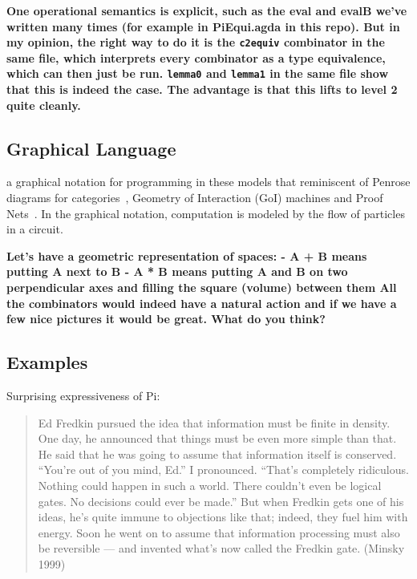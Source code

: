 \documentclass{article}
\newcommand{\amr}[1]{\fbox{Amr says:} \textbf{#1}}
\newcommand{\jc}[1]{\fbox{Jacques says:} \textbf{#1}}
\begin{document}
\jc{One operational semantics is explicit, such as the eval and 
evalB we've written many times (for example in PiEqui.agda in
this repo). But in my opinion, the right way to do it is the
\texttt{c2equiv} combinator in the same file, which interprets
every combinator as a type equivalence, which can then just be
run. \texttt{lemma0} and \texttt{lemma1} in the same file show
that this is indeed the case. The advantage is that this lifts
to level 2 quite cleanly.}

\subsection{Graphical Language} 

a graphical notation for programming in these models that reminiscent
of Penrose diagrams for categories~\cite{selinger-graphical}, Geometry
of Interaction (GoI) machines and Proof
Nets~\cite{Mackie2011,DBLP:conf/popl/Mackie95}. In the graphical
notation, computation is modeled by the flow of particles in a
circuit.

\amr{
  Let’s have a geometric representation of spaces:
- A + B means putting A next to B
- A * B means putting A and B on two perpendicular axes and filling
the square (volume) between them
All the combinators would indeed have a natural action and if we have
a few nice pictures it would be great. What do you think? }

\subsection{Examples} 

Surprising expressiveness of Pi:

\begin{quote}
  Ed Fredkin pursued the idea that information must be finite in
  density. One day, he announced that things must be even more simple
  than that. He said that he was going to assume that information
  itself is conserved. “You’re out of you mind, Ed.” I
  pronounced. “That’s completely ridiculous. Nothing could happen in
  such a world. There couldn’t even be logical gates. No decisions
  could ever be made.” But when Fredkin gets one of his ideas, he’s
  quite immune to objections like that; indeed, they fuel him with
  energy. Soon he went on to assume that information processing must
  also be reversible — and invented what’s now called the Fredkin
  gate. (Minsky 1999)
\end{quote}
\end{document}
